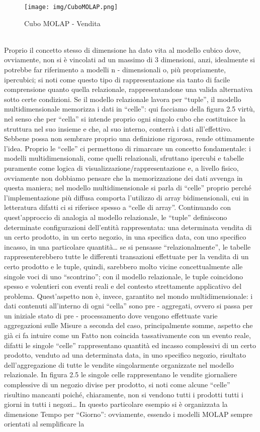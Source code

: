 \documentclass[a4paper,12pt]{report}
\begin{document}
\begin{figure}[ht]
    \centering
    \texttt{[image: img/CuboMOLAP.png]}
    \caption{Cubo MOLAP - Vendita}
\end{figure}
\\[0ex]
Proprio il concetto stesso di dimensione ha dato vita al modello cubico dove, ovviamente, non si è vincolati ad un massimo di $3$ dimensioni, anzi, idealmente si potrebbe far riferimento a modelli n - dimensionali o, più propriamente, ipercubici; si noti come questo tipo di rappresentazione sia tanto di facile comprensione quanto quella relazionale, rappresentandone una valida alternativa sotto certe condizioni. 
Se il modello relazionale lavora per “tuple”, il modello multidimensionale memorizza i dati in “celle”: qui facciamo della figura 2.5 virtù, nel senso che per “cella” si intende proprio ogni singolo cubo che costituisce la struttura nel suo insieme e che, al suo interno, conterrà i dati all’effettivo. Sebbene possa non sembrare proprio una definizione rigorosa, rende ottimamente l’idea. Proprio le “celle” ci permettono di rimarcare un concetto fondamentale: i modelli multidimensionali, come quelli relazionali, sfruttano ipercubi e tabelle puramente come logica di visualizzazione/rappresentazione e, a livello fisico, ovviamente non dobbiamo pensare che la memorizzazione dei dati avvenga in questa maniera; nel modello multidimensionale si parla di “celle” proprio perché l’implementazione più diffusa comporta l’utilizzo di array bidimensionali, cui in letteratura difatti ci si riferisce spesso a “celle di array”. Continuando con quest’approccio di analogia al modello relazionale, le “tuple” definiscono determinate configurazioni dell’entità rappresentata: una determinata vendita di un certo prodotto, in un certo negozio, in una specifica data, con uno specifico incasso, in una particolare quantità… se si pensasse “relazionalmente”, le tabelle rappresenterebbero tutte le differenti transazioni effettuate per la vendita di un certo prodotto e le tuple, quindi, sarebbero molto vicine concettualmente alle singole voci di uno “scontrino”; con il modello relazionale, le tuple coincidono spesso e volentieri con eventi reali e del contesto strettamente applicativo del problema. Quest’aspetto non è, invece, garantito nel mondo multidimensionale: i dati contenuti all’interno di ogni “cella” sono pre - aggregati, ovvero si passa per un iniziale stato di pre - processamento dove vengono effettuate varie aggregazioni sulle Misure a seconda del caso, principalmente somme, aspetto che già ci fa intuire come un Fatto non coincida tassativamente con un evento reale, difatti le singole “celle” rappresentano quantità ed incasso complessivi di un certo prodotto, venduto ad una determinata data, in uno specifico negozio, risultato dell’aggregazione di tutte le vendite singolarmente organizzate nel modello relazionale. In figura 2.5 le singole celle rappresentano le vendite giornaliere complessive di un negozio divise per prodotto, si noti come alcune “celle” risultino mancanti poiché, chiaramente, non si vendono tutti i prodotti tutti i giorni in tutti i negozi… In questo particolare esempio si è organizzata la dimensione Tempo per “Giorno”: ovviamente, essendo i modelli MOLAP sempre orientati al semplificare la 
\end{document}

